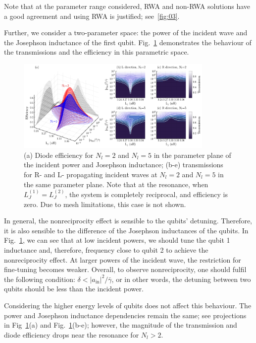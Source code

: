 \documentclass[lettersize,journal]{IEEEtran}
\begin{document}
Note that at the parameter range considered, RWA and non-RWA solutions have a good agreement and using RWA is justified; see~\ref{fig:03}.

Further, we consider a two-parameter space: the power of the incident wave and the Josephson inductance of the first qubit.
Fig.~\ref{fig:05} demonstrates the behaviour of the transmissions and the efficiency in this parametric space.
\begin{figure}[t]
    \centering
    \includegraphics[width=0.85\textwidth]{fig_5}
    \caption{(a) Diode efficiency for $N_l = 2$ and $N_l = 5$ in the parameter plane of the incident power and Josephson inductance; (b-e) transmissions for R- and L- propagating incident waves at $N_l = 2$ and $N_l = 5$ in the same parameter plane. Note that at the resonance, when $L_J^{(1)} = L_J^{(2)}$, the system is completely reciprocal, and efficiency is zero. Due to mesh limitations, this case is not shown.}
    \label{fig:05}
\end{figure}
In general, the nonreciprocity effect is sensible to the qubits' detuning.
Therefore, it is also sensible to the difference of the Josephson inductances of the qubits.
In Fig.~\ref{fig:05}, we can see that at low incident powers, we should tune the qubit 1 inductance and, therefore, frequency close to qubit 2 to achieve the nonreciprocity effect.
At larger powers of the incident wave, the restriction for fine-tuning becomes weaker.
Overall, to observe nonreciprocity, one should fulfil the following condition: $\delta < |a_\mathrm{in}|^2 / \bar{\gamma}$, or in other words, the detuning between two qubits should be less than the incident power.

Considering the higher energy levels of qubits does not affect this behaviour.
The power and Josephson inductance dependencies remain the same; see projections in Fig~\ref{fig:05}(a) and Fig.~\ref{fig:05}(b-e); however, the magnitude of the transmission and diode efficiency drops near the resonance for $N_l > 2$.
\end{document}
